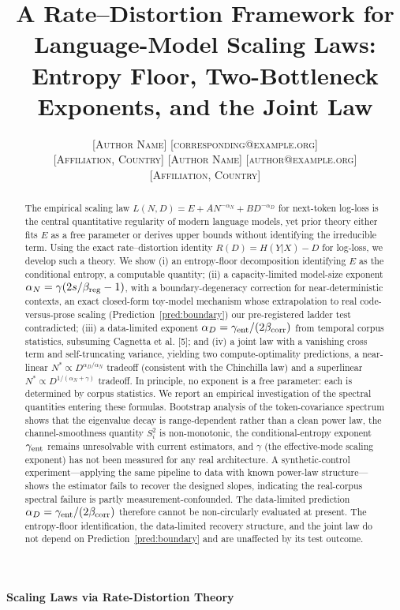 \documentclass[12pt]{article}
\title{A Rate--Distortion Framework for Language-Model Scaling Laws:
Entropy Floor, Two-Bottleneck Exponents, and the Joint Law}
\author{%
  \name \textsc{[Author Name]} \email \textsc{[corresponding@example.org]}\\
  \addr \textsc{[Affiliation, Country]}
  \AND
  \name \textsc{[Author Name]} \email \textsc{[author@example.org]}\\
  \addr \textsc{[Affiliation, Country]}
}
\theoremstyle{remark}
\begin{document}
\begin{center}{\LARGE\bf Scaling Laws via Rate-Distortion Theory}\end{center}\doublespacing


\maketitle

\begin{abstract}%
The empirical scaling law
$L(N,D) = E + A N^{-\alpha_N} + B D^{-\alpha_D}$ for next-token log-loss is
the central quantitative regularity of modern language models, yet prior
theory either fits $E$ as a free parameter or derives upper bounds without
identifying the irreducible term. Using
the exact rate--distortion identity $R(D)=H(Y|X)-D$ for log-loss, we develop
such a theory. We show (i) an entropy-floor decomposition identifying $E$ as
the conditional entropy, a computable quantity; (ii) a capacity-limited
model-size exponent $\alpha_N=\gamma(2s/\beta_{\rm reg}-1)$, with a
boundary-degeneracy correction for near-deterministic contexts, an exact
closed-form toy-model mechanism whose extrapolation to real
code-versus-prose scaling (Prediction~\ref{pred:boundary}) our
pre-registered ladder test contradicted; (iii) a data-limited exponent
$\alpha_D=\gamma_{\rm ent}/(2\beta_{\rm corr})$ from temporal corpus
statistics, subsuming Cagnetta et al. [5]; and (iv) a joint law with a vanishing
cross term and self-truncating variance, yielding two compute-optimality
predictions, a near-linear $N^*\propto D^{\alpha_D/\alpha_N}$ tradeoff
(consistent with the Chinchilla law) and a superlinear
$N^*\propto D^{1/(\alpha_N+\gamma)}$ tradeoff. In principle, no exponent is a
free parameter: each is determined by corpus statistics. We report an empirical
investigation of the spectral quantities entering these formulas. Bootstrap
analysis of the token-covariance spectrum shows that the eigenvalue decay is
range-dependent rather than a clean power law, the channel-smoothness quantity
$S_i^2$ is non-monotonic, the conditional-entropy exponent $\gamma_{\rm ent}$
remains unresolvable with current estimators, and $\gamma$ (the effective-mode
scaling exponent) has not been measured for any real architecture. A
synthetic-control experiment---applying the same pipeline to data with known
power-law structure---shows the estimator fails to recover the designed
slopes, indicating the real-corpus spectral failure is partly
measurement-confounded. The data-limited prediction
$\alpha_D=\gamma_{\rm ent}/(2\beta_{\rm corr})$ therefore cannot be
non-circularly evaluated at present. The entropy-floor identification, the
data-limited recovery structure, and the joint law do not depend on
Prediction~\ref{pred:boundary} and are unaffected by its test outcome.
\end{abstract}
\end{document}
